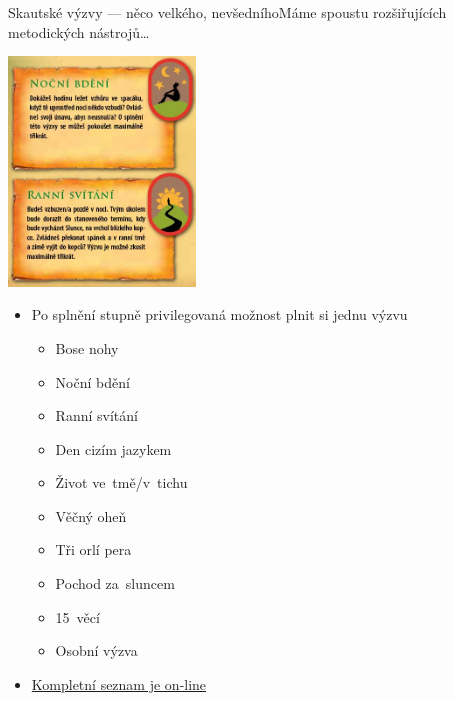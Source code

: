 \documentclass[compress, ucs, xelatex, 11pt, xcolor=dvipsnames, print, aspectratio=169,
	hyperref={
		bookmarks=true,
		unicode=true,
		colorlinks=true,
		pdftitle={Skautska vychovna metoda},
		plainpages=false,
		pdfauthor={Vojtech Zeisek},
		pdfsubject={Skautska vychovna metoda a jeji vyvoj za posledni stoleti a desetileti},
		pdfcreator={XeLaTeX},
		pdfkeywords={Junak, Pedagogika, Skaut, Skauting, Vychovna metoda},
		linkcolor=Red, %
		anchorcolor=ForestGreen, %
		citecolor=ForestGreen, %
		filecolor=ForestGreen, %
		menucolor=ForestGreen, %
		urlcolor=Sepia, %
		pdftex},
	url={hyphens, lowtilde} %
	]{beamer}
\begin{document}
\begin{frame}{Skautské výzvy --- něco velkého, nevšedního}{Máme spoustu rozšiřujících metodických nástrojů\ldots}
	\begin{multicols}{2}
		\includegraphics[height=6.1cm]{vyzvy.png}
		\begin{itemize}
			\item Po splnění stupně privilegovaná možnost plnit si jednu výzvu
			\begin{itemize}
				\item Bose nohy
				\item Noční bdění
				\item Ranní svítání
				\item Den cizím jazykem
				\item Život ve~tmě/v~tichu
				\item Věčný oheň
				\item Tři orlí pera
				\item Pochod za~sluncem
				\item 15~věcí
				\item Osobní výzva
			\end{itemize}
			\item \href{https://krizovatka.skaut.cz/oddil/program/skautky-a-skauti/skauti-skautky-stare-stezky/skauti-skautky-stezky-vyzvy}{Kompletní seznam je on-line}
		\end{itemize}
	\end{multicols}
\end{frame}
\end{document}
